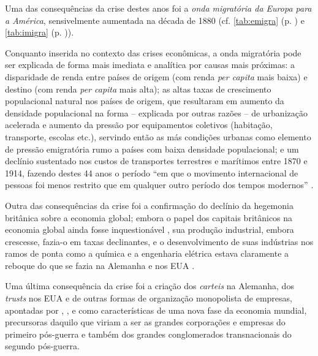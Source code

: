 Uma das consequências da crise destes anos foi a \textit{onda migratória da Europa para a América}, sensivelmente aumentada na década de 1880 (cf. \autoref{tab:emigra} (p. \pageref{tab:emigra}) e \autoref{tab:imigra} (p. \pageref{tab:imigra})).





Conquanto inserida no contexto das crises econômicas, a onda migratória pode ser explicada de forma mais imediata e analítica por causas mais próximas: a disparidade de renda entre países de origem (com renda \textit{per capita} mais baixa) e destino (com renda \textit{per capita} mais alta); as altas taxas de crescimento populacional natural nos países de origem, que resultaram em aumento da densidade populacional na forma -- explicada por outras razões -- de urbanização acelerada e aumento da pressão por equipamentos coletivos (habitação, transporte, escolas etc.), servindo então as más condições urbanas como elemento de pressão emigratória rumo a países com baixa densidade populacional; e um declínio sustentado nos custos de transportes terrestres e marítimos entre 1870 e 1914, fazendo destes 44 anos o período ``em que o movimento internacional de pessoas foi menos restrito que em qualquer outro período dos tempos modernos'' \cite[p.~616]{heitger_migration_1993}.

Outra das consequências da crise foi a confirmação do declínio da hegemonia britânica sobre a economia global; embora o papel dos capitais britânicos na economia global ainda fosse inquestionável \cite{goetzmann_british_2006,rippy_britlat_1954,stone_british_1977}, sua produção industrial, embora crescesse, fazia-o em taxas declinantes, e o desenvolvimento de suas indústrias nos ramos de ponta como a química e a engenharia elétrica estava claramente a reboque do que se fazia na Alemanha e nos EUA \cite[p.~207]{Musson1959}. 

Uma última consequência da crise foi a criação dos \textit{carteis} na Alemanha, dos \textit{trusts} nos EUA e de outras formas de organização monopolista de empresas, apontadas por , , e  como características de uma nova fase da economia mundial, precursoras daquilo que viriam a ser as grandes corporações e empresas do primeiro pós-guerra e também dos grandes conglomerados transnacionais do segundo pós-guerra.

